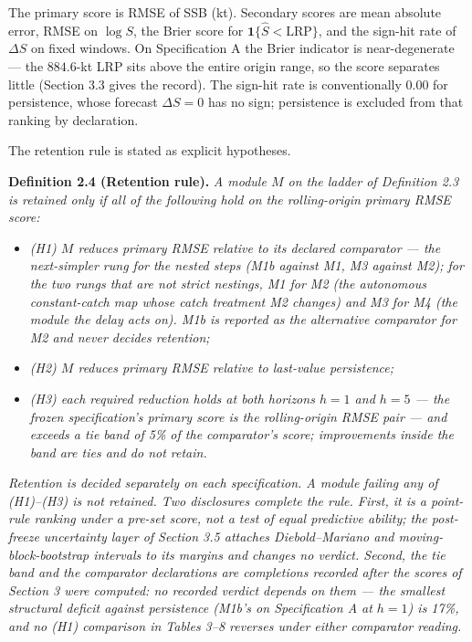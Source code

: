\documentclass[11pt]{article}
\providecommand{\tightlist}{\setlength{\itemsep}{0pt}\setlength{\parskip}{0pt}}
\begin{document}
The primary score is RMSE of SSB (kt). Secondary scores are mean
absolute error, RMSE on \(\log S\), the Brier score for
\(\mathbf{1}\{\hat S<\mathrm{LRP}\}\), and the sign-hit rate of
\(\Delta S\) on fixed windows. On Specification A the Brier indicator is
near-degenerate --- the \(884.6\)-kt LRP sits above the entire origin
range, so the score separates little (Section 3.3 gives the record). The
sign-hit rate is conventionally \(0.00\) for persistence, whose forecast
\(\Delta S = 0\) has no sign; persistence is excluded from that ranking
by declaration.

The retention rule is stated as explicit hypotheses.

\textbf{Definition 2.4 (Retention rule).} \emph{A module \(M\) on the
ladder of Definition 2.3 is retained only if all of the following hold
on the rolling-origin primary RMSE score:}

\begin{itemize}
\tightlist
\item
  \emph{(H1) \(M\) reduces primary RMSE relative to its declared
  comparator --- the next-simpler rung for the nested steps (M1b against
  M1, M3 against M2); for the two rungs that are not strict nestings, M1
  for M2 (the autonomous constant-catch map whose catch treatment M2
  changes) and M3 for M4 (the module the delay acts on). M1b is reported
  as the alternative comparator for M2 and never decides retention;}
\item
  \emph{(H2) \(M\) reduces primary RMSE relative to last-value
  persistence;}
\item
  \emph{(H3) each required reduction holds at both horizons \(h=1\) and
  \(h=5\) --- the frozen specification's primary score is the
  rolling-origin RMSE pair --- and exceeds a tie band of 5\% of the
  comparator's score; improvements inside the band are ties and do not
  retain.}
\end{itemize}

\emph{Retention is decided separately on each specification. A module
failing any of (H1)--(H3) is not retained. Two disclosures complete the
rule. First, it is a point-rule ranking under a pre-set score, not a
test of equal predictive ability; the post-freeze uncertainty layer of
Section 3.5 attaches Diebold--Mariano and moving-block-bootstrap
intervals to its margins and changes no verdict. Second, the tie band
and the comparator declarations are completions recorded after the
scores of Section 3 were computed: no recorded verdict depends on them
--- the smallest structural deficit against persistence (M1b's on
Specification A at \(h=1\)) is 17\%, and no (H1) comparison in Tables
3--8 reverses under either comparator reading.}
\end{document}
